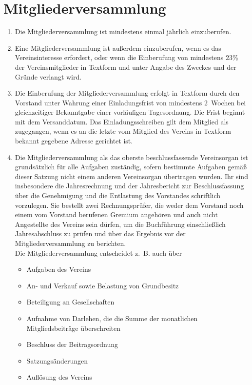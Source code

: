 \documentclass[a4paper,12pt]{scrartcl}
\begin{document}
\section{Mitgliederversammlung}
\begin{enumerate}
  \item Die Mitgliederversammlung ist mindestens einmal jährlich einzuberufen.
  \item Eine Mitgliederversammlung ist außerdem einzuberufen, wenn es das
    Vereinsinteresse erfordert, oder wenn die Einberufung von mindestens 23\%
    der Vereinsmitglieder in Textform und unter Angabe des Zweckes und der
    Gründe verlangt wird.
  \item Die Einberufung der Mitgliederversammlung erfolgt in Textform durch den
    Vorstand unter Wahrung einer Einladungsfrist von mindestens 2~Wochen bei
    gleichzeitiger Bekanntgabe einer vorläufigen Tagesordnung. Die Frist beginnt
    mit dem Versanddatum. Das Einladungsschreiben gilt dem Mitglied als
    zugegangen, wenn es an die letzte vom Mitglied des Vereins in Textform
    bekannt gegebene Adresse gerichtet ist.
  \item Die Mitgliederversammlung als das oberste beschlussfassende Vereinsorgan
    ist grundsätzlich für alle Aufgaben zuständig, sofern bestimmte Aufgaben
    gemäß dieser Satzung nicht einem anderen Vereinsorgan übertragen wurden.
    Ihr sind insbesondere die Jahresrechnung und der Jahresbericht zur
    Beschlussfassung über die Genehmigung und die Entlastung des Vorstandes
    schriftlich vorzulegen. Sie bestellt zwei Rechnungsprüfer, die weder dem
    Vorstand noch einem vom Vorstand berufenen Gremium angehören und auch nicht
    Angestellte des Vereins sein dürfen, um die Buchführung einschließlich
    Jahresabschluss zu prüfen und über das Ergebnis vor der
    Mitgliederversammlung zu berichten.\\
    Die Mitgliederversammlung entscheidet z.~B. auch über
    \begin{itemize}
      \item Aufgaben des Vereins
      \item An- und Verkauf sowie Belastung von Grundbesitz
      \item Beteiligung an Gesellschaften
      \item Aufnahme von Darlehen, die die Summe der monatlichen
        Mitgliedsbeiträge überschreiten
      \item Beschluss der Beitragsordnung
      \item Satzungsänderungen
      \item Auflösung des Vereins

\end{itemize}
\end{enumerate}
\end{document}
